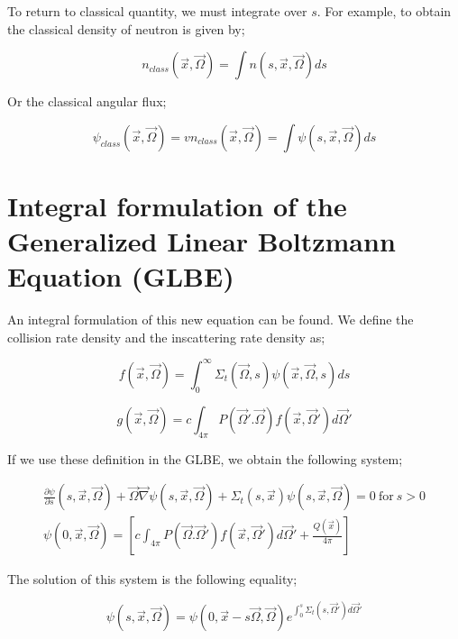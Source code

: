 \documentclass[a4paper, 12pt]{report}
\begin{document}
To return to classical quantity, we must integrate over $s$. For example, to obtain the classical density of neutron is given by;

\begin{equation}
n_{class}(\vec{x},\vec{\Omega}) = \int n(s,\vec{x},\vec{\Omega})ds
\end{equation}

Or the classical angular flux;

\begin{equation}
\psi_{class} (\vec{x},\vec{\Omega}) = v n_{class}(\vec{x},\vec{\Omega}) = \int \psi(s,\vec{x},\vec{\Omega})ds
\end{equation}

\section{Integral formulation of the Generalized Linear Boltzmann Equation (GLBE) }

An integral formulation of this new equation can be found.
We define the collision rate density and the inscattering rate density as;

\begin{equation}
f(\vec{x},\vec{\Omega}) = \int_0^\infty \Sigma_t(\vec{\Omega},s)\psi(\vec{x},\vec{\Omega},s)ds
\end{equation}

\begin{equation}\label{gg}
g(\vec{x},\vec{\Omega}) = c \int_{4\pi} P(\vec{\Omega}'.\vec{\Omega})f(\vec{x},\vec{\Omega}')d\vec{\Omega}'
\end{equation}

If we use these definition in the GLBE, we obtain the following system;

\begin{align}
\frac{\partial \psi}{\partial s} (s,\vec{x},\vec{\Omega}) + \vec{\Omega}\vec{\nabla}\psi(s,\vec{x},\vec{\Omega}) + \Sigma_t(s,\vec{x})\psi(s,\vec{x},\vec{\Omega})=0 \ \text{for} \ s>0 \\
\psi(0,\vec{x},\vec{\Omega}) = \left[ c \int_{4\pi} P(\vec{\Omega}.\vec{\Omega}')f(\vec{x},\vec{\Omega}')d\vec{\Omega}' + \frac{Q(\vec{x})}{4\pi} \right]
\end{align}

The solution of this system is the following equality;

\begin{equation}
\psi(s,\vec{x},\vec{\Omega}) = \psi(0,\vec{x}-s\vec{\Omega},\vec{\Omega}) e^{\int_0^s \Sigma_t(s,\vec{\Omega}')d\vec{\Omega}'}
\end{equation}
\end{document}
